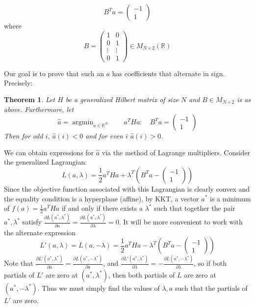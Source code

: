 \documentclass[11pt]{article}
\newtheorem{thm}{Theorem}[section]
\theoremstyle{definition}
\theoremstyle{remark}
\numberwithin{equation}{section}
\DeclareMathOperator{\argmin}{argmin}
\begin{document}
\begin{equation}
B^T a = \begin{pmatrix} -1 \\ 1\end{pmatrix}
\end{equation}
where \[B = \begin{pmatrix} 1 & 0\\ 
0 & 1 \\
\vdots & \vdots
\\ 
0 & 1 \end{pmatrix} \in M_{N\times 2}(\mathbb{R})\]

Our goal is to prove that such an $a$ has coefficients that alternate in sign. Precisely: 

\begin{thm}\label{positivity-hilbert-coefficients}
Let $H$ be a generalized Hilbert matrix of size $N$ and $B \in M_{N\times 2}$ is as above. Furthermore, let 
\[ \hat{a} = \argmin_{a\in\mathbb{R}^N} \quad \quad a^THa : \quad B^Ta = \begin{pmatrix} -1 \\ 1 \end{pmatrix}\]
Then for odd $i$, $\hat{a}(i) < 0$ and for even $i$ $\hat{a}(i) > 0$.
\end{thm} 

We can obtain expressions for $\hat{a}$ via the method of Lagrange multipliers. Consider the generalized Lagrangian: 
\[ L(a,\lambda) = \frac{1}{2} a^T H a + \lambda^T (B^Ta - \begin{pmatrix} -1 \\ 1 \end{pmatrix} ) \]
Since the objective function associated with this Lagrangian is clearly convex and the equality condition is a hyperplane (affine), by KKT, a vector $a^*$ is a minimum of $f(a) = \frac{1}{2} a^T H a$ if and only if there exists a $\lambda^*$ such that together the pair $a^*, \lambda^*$ satisfy $\frac{\partial L(a^*,\lambda^*)}{\partial a} = \frac{\partial L(a^*,\lambda^*)}{\partial \lambda} = 0$. It will be more convenient to work with the alternate expression 
\[ L'(a,\lambda) = L(a,-\lambda) = \frac{1}{2} a^T H a - \lambda^T (B^Ta - \begin{pmatrix} -1 \\ 1 \end{pmatrix} ) \] 
Note that $\frac{\partial L'(a^*,\lambda^*)}{\partial a} = \frac{\partial L(a^*, -\lambda^*)}{\partial a}$, and $\frac{\partial L'(a^*,\lambda^*)}{\partial \lambda} = -\frac{\partial L(a^*, -\lambda^*)}{\partial \lambda}$, so if both partials of $L'$ are zero at $(a^*, \lambda^*)$, then both partials of $L$ are zero at $(a^*, -\lambda^*)$. Thus we must simply find the values of $\lambda, a$ such that the partials of $L'$ are zero. \\
\end{document}
